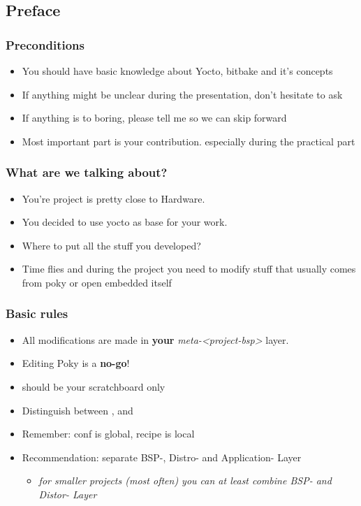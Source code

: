 \subsection{Preface}

\begin{frame}
\frametitle{Preconditions}
  \begin{itemize}
     \item You should have basic knowledge about Yocto, bitbake and it's concepts
     \item If anything might be unclear during the presentation, don't hesitate to ask
     \item If anything is to boring, please tell me so we can skip forward
     \item Most important part is your contribution. especially during the practical part
  \end{itemize}
\end{frame}

\begin{frame}
\frametitle{What are we talking about?}
  \begin{itemize}
     \item You're project is pretty close to Hardware.
     \item You decided to use yocto as base for your work.
     \item Where to put all the stuff you developed?
     \item Time flies and during the project you need to modify stuff that usually comes from poky or open embedded itself
  \end{itemize}
\end{frame}

\begin{frame}
\frametitle{Basic rules}
  \begin{itemize}
     \item All modifications are made in \textbf{your} {\em meta-<project-bsp>} layer.
     \item Editing Poky is a \textbf{no-go}!
     \item {} should be your scratchboard only
     \item Distinguish between ,  and 
     \item Remember: conf is global, recipe is local
     \item Recommendation: separate BSP-, Distro- and Application- Layer
        \begin{itemize}
           \item {\em for smaller projects (most often) you can at least combine BSP- and Distor- Layer}
        \end{itemize}
  \end{itemize}
\end{frame}

